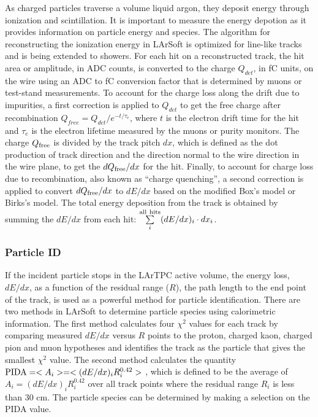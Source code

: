 As charged particles traverse a volume liquid argon, they deposit
energy through ionization and scintillation. It is important to
measure the energy depotion as it provides information on particle
energy and species. The algorithm for reconstructing the ionization
energy in LArSoft is optimized for line-like tracks and is being
extended to showers. 
For each hit on a reconstructed track, the hit area or amplitude, in ADC counts, is
converted to the charge $Q_{det}$, in fC units, on the wire using an
ADC to fC conversion factor that is determined by muons or test-stand
measurements. To account for the charge loss along the drift due to
impurities, a first correction is applied to $Q_{det}$ to get the free
charge after recombination $Q_{free} = Q_{det}/e^{-t/\tau_{e}}$, where
$t$ is the electron drift time for the hit and $\tau_{e}$ is the
electron lifetime measured by the muons or purity monitors. The charge
$Q_{\rm{free}}$ is divided by the track pitch $dx$, which is defined as the
dot production of track direction and the direction normal to the wire
direction in the wire plane, to get the $dQ_{\rm{free}}/dx$ for the
hit. Finally, to account for charge loss due to recombination, also
known as ``charge quenching'', a second correction is applied to
convert $dQ_{\rm{free}}/dx$ to $dE/dx$ based on the modified Box's model
\cite{box} or Birks's model\cite{birks}. The total energy
deposition from the track is obtained by summing the $dE/dx$ from each
hit: $\sum\limits_{i}^{\rm{all\ hits}}(dE/dx)_{i}\cdot dx_{i}$.


\subsubsection{Particle ID}


If the incident particle stops in the LArTPC active volume, the energy
loss, $dE/dx$, as a function of the residual range ($R$), the path
length to the end point of the track, is used as a powerful method for
particle identification. There are two methods in LArSoft to determine
particle species using calorimetric information. The first method
calculates four $\chi^{2}$ values for each track by comparing measured
$dE/dx$ versus $R$ points to the proton, charged kaon, charged pion
and muon hypotheses and identifies the track as the particle that
gives the smallest $\chi^{2}$ value. The second method calculates the
quantity ${\rm{PIDA}} = <A_{i}> = <(dE/dx)_{i}R_{i}^{0.42}>$ \cite{box},
which is defined to be the average of $A_{i} =
(dE/dx)_{i}R_{i}^{0.42}$ over all track points where the residual
range $R_{i}$ is less than 30 cm. The particle species can be
determined by making a selection on the PIDA value.

